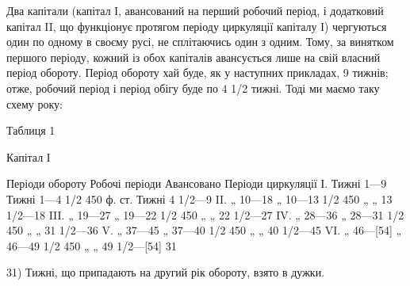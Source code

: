 Два капітали (капітал І, авансований на перший робочий період, і додатковий
капітал II, що функціонує протягом періоду циркуляції капіталу І)
чергуються один по одному в своєму русі, не сплітаючись один з одним.
Тому, за винятком першого періоду, кожний із обох капіталів авансується
лише на свій власний період обороту. Період обороту хай буде,
як у наступних прикладах, 9 тижнів; отже, робочий період і період обігу
буде по 4 1/2 тижні. Тоді ми маємо таку схему року:

Таблиця 1

Капітал І

Періоди обороту    Робочі періоди    Авансовано    Періоди циркуляції
І. Тижні 1—9    Тижні 1—4 1/2                 450 ф. ст.        Тижні 4 1/2—9
II.    „   10—18        „      10—13 1/2             450 „ „                  13 1/2—18
III.   „   19—27       „       19—22 1/2             450 „ „                22 1/2—27
IV.   „    28—36      „        28—31 1/2             450 „ „               31 1/2—36
V.     „    37—45      „        37—40 1/2             450 „ „               40 1/2—45
VI.   „    46—[54]  „        46—49 1/2            450 „ „            49 1/2—[54] 31

31) Тижні, що припадають на другий рік обороту, взято в дужки.
